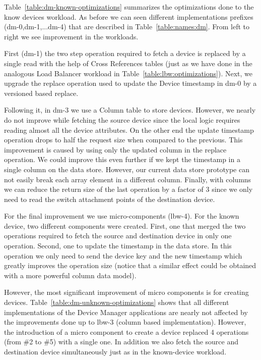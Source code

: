 Table~\ref{table:dm-known-optimizations} summarizes the optimizations done to the know  devices workload. 
As before we can seen different implementations prefixes (dm-0,dm-1,...dm-4) that are described in Table~\ref{table:names:dm}. 
From left to right we see improvement in the workloads. 

First  (dm-1) the two step operation required to fetch a device is replaced by a single read  with the help of Cross References tables (just as we have done in the analogous Load Balancer workload in Table~\ref{table:lbw:optimizations}). 
Next, we upgrade  the replace operation used to update the Device timestamp in dm-0 by a versioned based replace. 

Following it, in dm-3 we use a Column table to store devices.  
However,  we nearly do not improve  while fetching the source device since the local logic requires reading almost all the device attributes. 
On the other end the update timestamp operation drops to half the request size when compared to the previous.  
This improvement is caused by using only the updated column in the replace operation. 
We could improve this even further if we kept the timestamp in a single column on the data store. 
However, our current data store prototype can not easily break each array element in a different column. 
Finally,  with columns we can reduce the return size of the last operation by a factor of 3 since we only need to read the switch attachment points of the destination device. 

For the final improvement we use micro-components (lbw-4).  
For the known device, two different  components were created. 
First, one that merged the two operations required to fetch the source and destination device in only one operation.
Second, one to update the timestamp in the data store.  In this operation we only need to send the device key and the new timestamp which greatly improves the operation size (notice that a similar effect could be obtained with a more powerful column data model).  

However,  the most significant improvement of micro components is for creating devices. Table~\ref{table:dm-unknown-optimizations} shows that all different implementations of the Device Manager applications are nearly not affected by the improvements  done up to lbw-3 (column based implementation). However, the introduction of a micro component to create a device replaced  4 operations (from \#2 to \#5) with a single one.  In addition we also fetch the source and destination device simultaneously just as in the known-device workload. 

